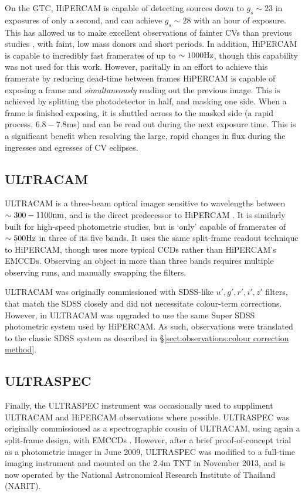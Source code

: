 On the GTC, HiPERCAM is capable of detecting sources down to $g_s \sim 23$ in exposures of only a second, and can achieve $g_s \sim 28$ with an hour of exposure. This has allowed us to make excellent observations of fainter CVs than previous studies \citep{McallisterThesis}, with faint, low mass donors and short periods. In addition, HiPERCAM is capable to incredibly fast framerates of up to $\sim 1000 \rm Hz$, though this capability was not used for this work. However, paritally in an effort to achieve this framerate by reducing dead-time between frames HiPERCAM is capable of exposing a frame and {\it simultaneously} reading out the previous image. This is achieved by splitting the photodetector in half, and masking one side. When a frame is finished exposing, it is shuttled across to the masked side (a rapid process, $6.8 - 7.8$ms) and can be read out during the next exposure time. This is a significant benefit when resolving the large, rapid changes in flux during the ingresses and egresses of CV eclipses.


\subsection{ULTRACAM}
ULTRACAM is a three-beam optical imager sensitive to wavelengths between $\sim 300 - 1100 \rm nm$, and is the direct predecessor to HiPERCAM \citep{dhillon2007}. 
It is similarly built for high-speed photometric studies, but is `only' capable of framerates of $\sim 500 \rm Hz$ in three of its five bands. 
It uses the same split-frame readout technique to HiPERCAM, though uses more typical CCDs rather than HiPERCAM's EMCCDs. Observing an object in more than three bands requires multiple observing runs, and manually swapping the filters.

ULTRACAM was originally commissioned with SDSS-like $u',g',r',i',z'$ filters, that match the SDSS closely and did not necessitate colour-term corrections. However, in  ULTRACAM was upgraded to use the same Super SDSS photometric system used by HiPERCAM. As such, observations were translated to the classic SDSS system as described in \S\ref{sect:observations:colour correction method}. 


\subsection{ULTRASPEC}
Finally, the ULTRASPEC instrument was occasionally used to suppliment ULTRACAM and HiPERCAM observations where possible. ULTRASPEC was originally commissioned as a spectrographic cousin of ULTRACAM, using again a split-frame design, with EMCCDs \citep{dhillon2014}. 
However, after a brief proof-of-concept trial as a photometric imager in June 2009, ULTRASPEC was modified to a full-time imaging instrument and mounted on the 2.4m TNT in November 2013, and is now operated by the National Astronomical Research Institute of Thailand (NARIT).

